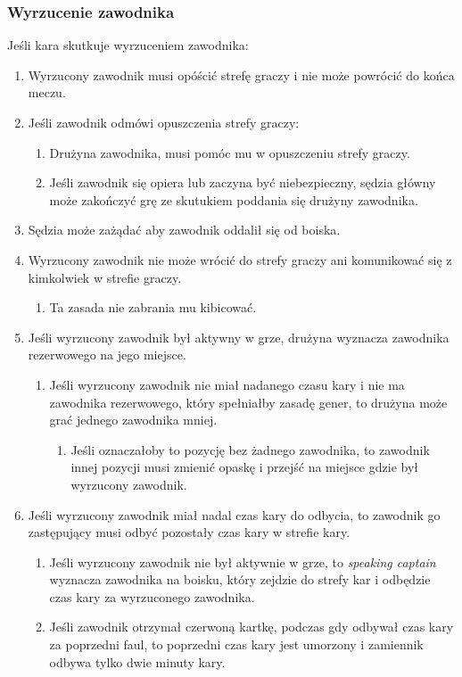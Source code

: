 \documentclass[11pt,a4paper]{article}
\begin{document}
\subsubsection{Wyrzucenie zawodnika}
Jeśli kara skutkuje wyrzuceniem zawodnika:
\begin{enumerate}
  \item Wyrzucony zawodnik musi opóścić strefę graczy i nie może powrócić do końca meczu.
  \item Jeśli zawodnik odmówi opuszczenia strefy graczy:
  \begin{enumerate}
    \item Drużyna zawodnika, musi pomóc mu w opuszczeniu strefy graczy.
    \item Jeśli zawodnik się opiera lub zaczyna być niebezpieczny, sędzia główny może zakończyć grę ze skutukiem poddania się drużyny zawodnika.
  \end{enumerate}
  \item Sędzia może zażądać aby zawodnik oddalił się od boiska.
  \item Wyrzucony zawodnik nie może wrócić do strefy graczy ani komunikować się z kimkolwiek w strefie graczy.
  \begin{enumerate}
    \item Ta zasada nie zabrania mu kibicować.
  \end{enumerate}
  \item Jeśli wyrzucony zawodnik był aktywny w grze, drużyna wyznacza zawodnika rezerwowego na jego miejsce.
  \begin{enumerate}
    \item Jeśli wyrzucony zawodnik nie miał nadanego czasu kary i nie ma zawodnika rezerwowego, który spełniałby zasadę gener, to drużyna może grać jednego zawodnika mniej.
    \begin{enumerate}
      \item Jeśli oznaczałoby to pozycję bez żadnego zawodnika, to zawodnik innej pozycji musi zmienić opaskę i przejść na miejsce gdzie był wyrzucony zawodnik.
    \end{enumerate}
  \end{enumerate}
  \item Jeśli wyrzucony zawodnik miał nadal czas kary do odbycia, to zawodnik go zastępujący musi odbyć pozostały czas kary w strefie kary.
  \begin{enumerate}
    \item Jeśli wyrzucony zawodnik nie był aktywnie w grze, to \emph{speaking captain} wyznacza zawodnika na boisku, który zejdzie do strefy kar i odbędzie czas kary za wyrzuconego zawodnika.
    \item Jeśli zawodnik otrzymał czerwoną kartkę, podczas gdy odbywał czas kary za poprzedni faul, to poprzedni czas kary jest umorzony i zamiennik odbywa tylko dwie minuty kary.
  \end{enumerate}
\end{enumerate}
\end{document}
